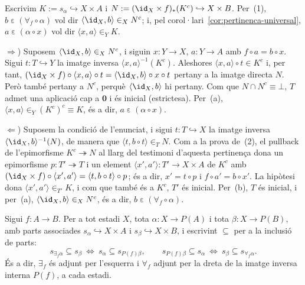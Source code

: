 \begin{prova}
Escrivim \(K:=s_\alpha\hookrightarrow X\times A\) i
\(N:=(\id_X\times f)_*(K^c)\hookrightarrow X\times B\). Per~(1),
\(b\mathrel{\varepsilon}(\forall_f\circ\alpha)\) vol dir
\(\langle\id_X,b\rangle\in_X N^c\); i, pel
corol·lari~\ref{cor:pertinenca-universal},
\(a\mathrel{\varepsilon}(\alpha\circ x)\) vol dir \(\langle x,a\rangle\in_Y K\).

\(\Rightarrow\)) Suposem \(\langle\id_X,b\rangle\in_X N^c\), i siguin
\(x\colon Y\to X\), \(a\colon Y\to A\) amb \(f\circ a=b\circ x\). Sigui
\(t\colon T\hookrightarrow Y\) la imatge inversa \(\langle x,a\rangle^{-1}(K^c)\).
Aleshores \(\langle x,a\rangle\circ t\in K^c\) i, per tant,
\((\id_X\times f)\circ\langle x,a\rangle\circ t=\langle\id_X,b\rangle\circ x\circ t\)
pertany a la imatge directa \(N\). Però també pertany a \(N^c\), perquè
\(\langle\id_X,b\rangle\) hi pertany. Com que \(N\cap N^c\equiv\bot\), \(T\)
admet una aplicació cap a \(\mathbf0\) i és inicial (estrictesa). Per~(a),
\(\langle x,a\rangle\in_Y(K^c)^c\equiv K\), és a dir,
\(a\mathrel{\varepsilon}(\alpha\circ x)\).

\(\Leftarrow\)) Suposem la condició de l'enunciat, i sigui
\(t\colon T\hookrightarrow X\) la imatge inversa \(\langle\id_X,b\rangle^{-1}(N)\),
de manera que \(\langle t,b\circ t\rangle\in_T N\). Com a la prova de~(2),
el pullback de l'epimorfisme \(K^c\twoheadrightarrow N\) al llarg del
testimoni d'aquesta pertinença dona un epimorfisme
\(p\colon T'\twoheadrightarrow T\) i un element \(\langle x',a'\rangle\colon
T'\to X\times A\) de \(K^c\) amb \((\id_X\times f)\circ\langle x',a'\rangle
=\langle t,b\circ t\rangle\circ p\); és a dir, \(x'=t\circ p\) i
\(f\circ a'=b\circ x'\). La hipòtesi dona \(\langle x',a'\rangle\in_{T'}K\), i
com que també és a \(K^c\), \(T'\) és inicial. Per~(b), \(T\) és inicial, i
per~(a), \(\langle\id_X,b\rangle\in_X N^c\), és a dir,
\(b\mathrel{\varepsilon}(\forall_f\circ\alpha)\).
\end{prova}

\begin{proposicio}\label{prop:quantificadors-adjuncio}
Sigui \(f\colon A\to B\). Per a tot estadi \(X\), tota
\(\alpha\colon X\to P(A)\) i tota \(\beta\colon X\to P(B)\), amb parts
associades \(s_\alpha\hookrightarrow X\times A\) i
\(s_\beta\hookrightarrow X\times B\), i escrivint \(\subseteq\) per a la
inclusió de parts:
\[
s_{\exists_f\alpha}\subseteq s_\beta
\ \Longleftrightarrow\
s_\alpha\subseteq s_{P(f)\beta},
\qquad
s_{P(f)\beta}\subseteq s_\alpha
\ \Longleftrightarrow\
s_\beta\subseteq s_{\forall_f\alpha} .
\]
És a dir, \(\exists_f\) és adjunt per l'esquerra i \(\forall_f\) adjunt
per la dreta de la imatge inversa interna \(P(f)\), a cada estadi.
\end{proposicio}

